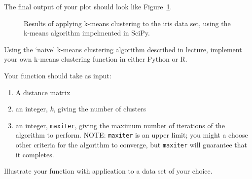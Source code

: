 The final output of your plot should look like Figure~\ref{fig:pykmeans}.

\begin{figure}[ht!]
  \caption{Results of applying k-means clustering to the iris data set, using the k-means algorithm impelmented in SciPy.\label{fig:pykmeans}}
\end{figure}


\medskip
\begin{assignment}
\small

Using the `naive' k-means clustering algorithm described in lecture, implement your own k-means clustering function in either Python or R.

Your function should take as input:
\begin{enumerate}
\item A distance matrix
\item an integer, $k$, giving the number of clusters
\item an integer, \verb|maxiter|, giving the maximum number of iterations of the algorithm to perform. NOTE: \verb|maxiter| is an upper limit; you might a choose other criteria for the algorithm to converge, but \verb|maxiter| will guarantee that it completes.
\end{enumerate}

Illustrate your function with application to a data set of your choice.


\end{assignment}



